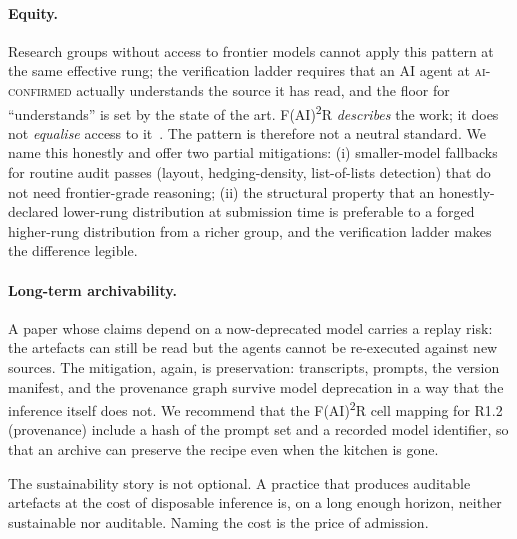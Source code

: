 \paragraph{Equity.}
Research groups without access to frontier models cannot apply this
pattern at the same effective rung; the verification ladder requires
that an AI agent at \textsc{ai-confirmed} actually understands the
source it has read, and the floor for ``understands'' is set by the
state of the art. F(AI)\textsuperscript{2}R \emph{describes} the
work; it does not \emph{equalise} access to
it~\cite{bender2021stochastic,birhane2022values}. The pattern is
therefore not a neutral standard. We name this honestly and offer
two partial mitigations: (i) smaller-model fallbacks for routine
audit passes (layout, hedging-density, list-of-lists detection) that
do not need frontier-grade reasoning; (ii) the structural property
that an honestly-declared lower-rung distribution at submission time
is preferable to a forged higher-rung distribution from a richer
group, and the verification ladder makes the difference legible.

\paragraph{Long-term archivability.}
A paper whose claims depend on a now-deprecated model carries a
replay risk: the artefacts can still be read but the agents cannot
be re-executed against new sources. The mitigation, again, is
preservation: transcripts, prompts, the version manifest, and the
provenance graph survive model deprecation in a way that the
inference itself does not. We recommend that the
F(AI)\textsuperscript{2}R cell mapping for R1.2 (provenance) include
a hash of the prompt set and a recorded model identifier, so that an
archive can preserve the recipe even when the kitchen is gone.

The sustainability story is not optional. A practice that produces
auditable artefacts at the cost of disposable inference is, on a
long enough horizon, neither sustainable nor auditable. Naming the
cost is the price of admission.

